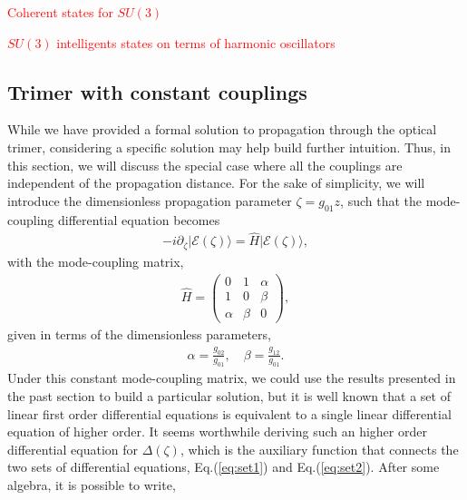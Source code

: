 \documentclass[9pt,twocolumn,twoside]{osajnl}
\begin{document}
\textcolor{red}{Coherent states for $SU(3)$ \cite{Gnutzmann1998p9871}}

\textcolor{red}{$SU(3)$ intelligents states on terms of harmonic oscillators \cite{Rowe1999p3604}}



\subsection{Trimer with constant couplings}

While we have provided a formal solution to propagation through the optical trimer, considering a specific solution may help build further intuition. 
Thus, in this section, we will discuss the special case where all the couplings are independent of the propagation distance.
For the sake of simplicity, we will introduce the dimensionless propagation parameter $\zeta = g_{01} z$, such that the mode-coupling differential equation becomes 
\begin{eqnarray}
- i \partial_{\zeta} \vert \mathcal{E}(\zeta) \rangle = \hat{H} \vert \mathcal{E}(\zeta) \rangle, 
\end{eqnarray}
with the mode-coupling matrix,
\begin{eqnarray}
\hat{H} = \left( \begin{array}{ccc} 
0  & 1 & \alpha  \\
1 & 0 & \beta \\
\alpha & \beta & 0
\end{array} \right), \label{eq:hmlt2}
\end{eqnarray}
given in terms of the dimensionless parameters,
\begin{eqnarray}
\alpha =\frac{g_{02}}{g_{01}}, \quad \beta=\frac{g_{12}}{g_{01}}.
\end{eqnarray}
Under this constant mode-coupling matrix, we could use the results presented in the past section to build a particular solution, but it is well known that a set of linear first order differential equations is equivalent to a single linear differential equation of higher order.
It seems worthwhile deriving such an higher order differential equation for $\Delta(\zeta)$, which is the auxiliary function that connects the two sets of differential equations, Eq.(\ref{eq:set1}) and Eq.(\ref{eq:set2}).
After some algebra, it is possible to write,
\end{document}
